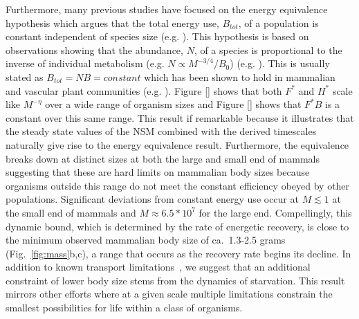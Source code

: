 \documentclass{pnastwo}
\begin{document}
\begin{article}
Furthermore, many previous studies have focused on the energy equivalence hypothesis which argues that the total energy use, $B_{tot}$, of a population is constant independent of species size (e.g. \cite{allen2002,enquist1998}). This hypothesis is based on observations showing that the abundance, $N$, of a species is proportional to the inverse of individual metabolism (e.g. $N\propto M^{-3/4}/B_{0}$)  (e.g. \cite{allen2002,enquist1998}). This is usually stated as $B_{tot}=NB=constant$ which has been shown to hold in mammalian and vascular plant communities (e.g. \cite{allen2002,enquist1998}). Figure \ref{} shows that both $F^{*}$ and $H^{*}$ scale like $M^{-\eta}$ over a wide range of organism sizes and Figure \ref{} shows that $F^{*}B$ is a constant over this same range. This result if remarkable because it illustrates that the steady state values of the NSM combined with the derived timescales naturally give rise to the energy equivalence result. Furthermore, the equivalence breaks down at distinct sizes at both the large and small end of mammals suggesting that these are hard limits on mammalian body sizes because organisms outside this range do not meet the constant efficiency obeyed by other populations. Significant deviations from constant energy use occur at $M \lesssim 1$ at the small end of mammals and $M\approx 6.5*10^7$ for the large end. Compellingly, this dynamic bound, which is determined by the rate of energetic recovery, is
close to the minimum observed mammalian body size of ca.\ 1.3-2.5 grams
(Fig.~\ref{fig:mass}b,c), a range that occurs as the recovery rate begins its
decline.  In addition to known transport limitations~\cite{West:2002ud}, we
suggest that an additional constraint of lower body size stems from the
dynamics of starvation.  This result mirrors other efforts \cite{Kempes:2012hy,Kempes:2016}
where at a given scale multiple limitations constrain the smallest possibilities for
life within a class of organisms.

%





\end{article}
\end{document}
